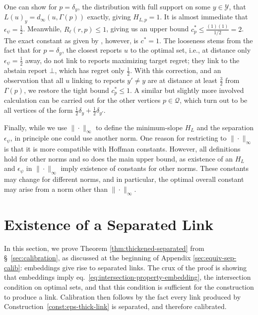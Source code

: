 \documentclass[11pt]{article}
\newcommand{\Y}{\mathcal{Y}}
\begin{document}
One can show for $p = \delta_y$, the distribution with full support on some $y \in \Y$, that $L(u)_y = d_{\infty}(u,\Gamma(p))$ exactly, giving $H_{L,p} = 1$.
It is almost immediate that $\epsilon_{\psi} = \tfrac{1}{2}$.
Meanwhile, $R_{\ell}(r,p) \leq 1$, giving us an upper bound $c^*_p \leq \frac{(1)(1)}{1/2} = 2$.
The exact constant as given by \citeauthor{ramaswamy2018consistent}, however, is $c^* = 1$.
The looseness stems from the fact that for $p = \delta_y$, the closest reports $u$ to the optimal set, i.e., at distance only $\epsilon_{\psi} = \tfrac{1}{2}$ away, do not link to reports maximizing target regret; they link to the abstain report $\bot$, which has regret only $\tfrac{1}{2}$.
With this correction, and an observation that all $u$ linking to reports $y' \neq y$ are at distance at least $\tfrac{3}{2}$ from $\Gamma(p)$, we restore the tight bound $c^*_p \leq 1$.
A similar but slightly more involved calculation can be carried out for the other vertices $p \in \mathcal{Q}$, which turn out to be all vertices of the form $\tfrac{1}{2} \delta_y + \tfrac{1}{2} \delta_{y'}$.

Finally, while we use $\|\cdot\|_{\infty}$ to define the minimum-slope $H_L$ and the separation $\epsilon_\psi$, in principle one could use another norm.
One reason for restricting to $\|\cdot\|_\infty$ is that it is more compatible with Hoffman constants.
However, all definitions hold for other norms and so does the main upper bound, as existence of an $H_L$ and $\epsilon_{\psi}$ in $\|\cdot\|_{\infty}$ imply existence of constants for other norms.
These constants may change for different norms, and in particular, the optimal overall constant may arise from a norm other than $\|\cdot\|_\infty$.




\section{Existence of a Separated Link} \label{app:sep-link-exists}
In this section, we prove Theorem \ref{thm:thickened-separated} from \S~\ref{sec:calibration}, as discussed at the beginning of Appendix \ref{sec:equiv-sep-calib}: embeddings give rise to separated links.
The crux of the proof is showing that embeddings imply eq.~\eqref{eq:intersection-property-embedding}, the intersection condition on optimal sets, and that this condition is sufficient for the construction to produce a link.
Calibration then follows by the fact every link produced by Construction~\ref{const:eps-thick-link} is separated, and therefore calibrated.
\end{document}
